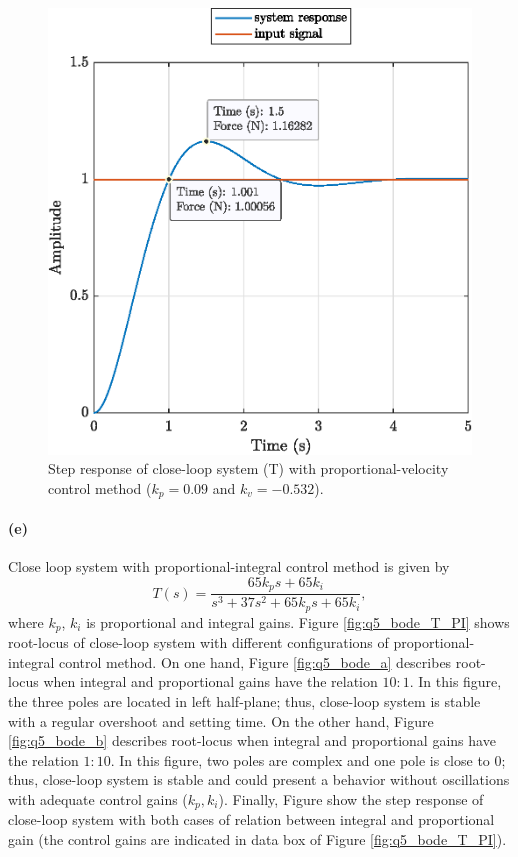 \begin{figure}[h!]
	\centering
	\includegraphics{images/q5_step_response_T.eps}
	\caption{Step response of close-loop system (T) with proportional-velocity control method ($k_p=0.09$ and $k_v=-0.532$).}
	\label{fig:q5_step_response_T}
\end{figure}

\paragraph{(e)} Close loop system with proportional-integral control method is given by
\begin{equation}
	T(s) = \frac{65 k_p s + 65 k_i}{s^3 + 37 s^2 + 65 k_p s + 65 k_i},
\end{equation}
\noindent where $k_p$, $k_i$ is proportional and integral gains. Figure \ref{fig:q5_bode_T_PI} shows root-locus of close-loop system with different configurations of  proportional-integral control method. On one hand, Figure \ref{fig:q5_bode_a} describes root-locus when integral and proportional gains have the relation $10:1$. In this figure, the three poles are located in left half-plane; thus, close-loop system is stable with a regular overshoot and setting time. On the other hand, Figure \ref{fig:q5_bode_b} describes root-locus when integral and proportional gains have the relation $1:10$. In this figure, two poles are complex and one pole is close to  $0$; thus, close-loop system is stable and could present a behavior without oscillations with adequate control gains ($k_p, k_i$). Finally, Figure show the step response of close-loop system with both cases of relation between integral and proportional gain (the control gains are indicated in data box of  Figure \ref{fig:q5_bode_T_PI}).

